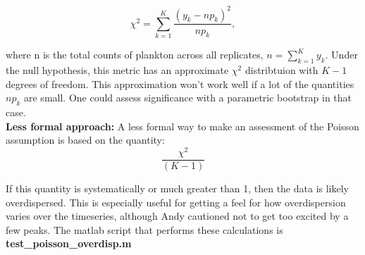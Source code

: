 \documentclass[11pt]{article}
\begin{document}
\[
\chi^2 = \sum_{k=1}^K \frac{(y_k-np_k)^2}{np_k},
\]

\noindent where n is the total counts of plankton across all replicates, $n= \sum_{k=1}^K y_k$. Under the null hypothesis, this metric has an approximate $\chi^2$ distribtuion with $K-1$ degrees of freedom. This approximation won't work well if a lot of the quantities $np_k$ are small. One could assess significance with a parametric bootstrap in that case.\\
                                               
\noindent \textbf{Less formal approach:} A less formal way to make an assessment of the Poisson assumption is based on the quantity:
\[
\frac{\chi^2}{(K-1)}
\]

\noindent If this quantity is systematically or much greater than 1, then the data is likely overdispersed. This is especially useful for getting a feel for how overdispersion varies over the timeseries, although Andy cautioned not to get too excited by a few peaks. The matlab script that performs these calculations is \textbf{test\_poisson\_overdisp.m}
\end{document}

